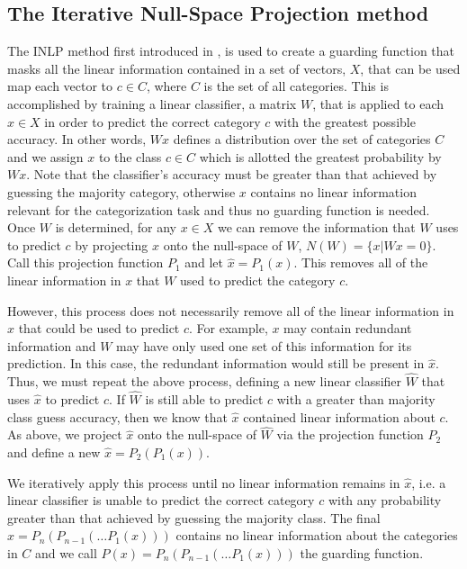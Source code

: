 \documentclass[11pt,a4paper]{article}
\begin{document}
\subsection{The Iterative Null-Space Projection method}
\label{sec:inlp-method}

The INLP method first introduced in \citealp{inlp}, is used to create a guarding function that masks all the linear information contained in a set of vectors, $X$, that can be used map each vector to $c \in C$, where $C$ is the set of all categories. This is accomplished by training a linear classifier, a matrix $W$, that is applied to each $x \in X$ in order to predict the correct category $c$ with the greatest possible accuracy. In other words, $Wx$ defines a distribution over the set of categories $C$ and we assign $x$ to the class $c \in C$ which is allotted the greatest probability by $Wx$. Note that the classifier's accuracy must be greater than that achieved by guessing the majority category, otherwise $x$ contains no linear information relevant for the categorization task and thus no guarding function is needed. Once $W$ is determined, for any $x \in X$ we can remove the information that $W$ uses to predict $c$ by projecting $x$ onto the null-space of $W$, $N(W) = \{x | Wx=0\}$. Call this projection function $P_1$ and let $\hat{x} = P_1(x)$. This removes all of the linear information in $x$ that $W$ used to predict the category $c$. 

However, this process does not necessarily remove all of the linear information in $x$ that could be used to predict $c$. For example, $x$ may contain redundant information and $W$ may have only used one set of this information for its prediction. In this case, the redundant information would still be present in $\hat{x}$. Thus, we must repeat the above process, defining a new linear classifier $\hat{W}$ that uses $\hat{x}$  to predict $c$. If $\hat{W}$ is still able to predict $c$ with a greater than majority class guess accuracy, then we know that $\hat{x}$ contained linear information about $c$. As above, we project $\hat{x}$ onto the null-space of $\hat{W}$ via the projection function $P_2$ and define a new $\hat{x} = P_2(P_1(x))$.

We iteratively apply this process until no linear information remains in $\hat{x}$, i.e. a linear classifier is unable to predict the correct category $c$ with any probability greater than that achieved by guessing the majority class. The final $\hat{x} = P_n(P_{n-1}(\dots P_1(x)))$ contains no linear information about the categories in $C$ and we call $P(x) = P_n(P_{n-1}(\dots P_1(x)))$ the guarding function. 
\end{document}
